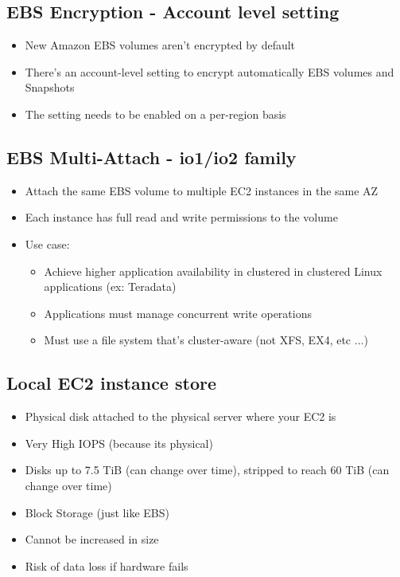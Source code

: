 \subsection{EBS Encryption - Account level setting}
\begin{itemize}
    \item New Amazon EBS volumes aren't encrypted by default
    \item There's an account-level setting to encrypt automatically EBS volumes and Snapshots
    \item The setting needs to be enabled on a per-region basis
\end{itemize}

\subsection{EBS Multi-Attach - io1/io2 family}
\begin{itemize}
    \item Attach the same EBS volume to multiple EC2 instances in the same AZ
    \item Each instance has full read and write permissions to the volume
    \item Use case:
    \begin{itemize}
        \item Achieve higher application availability in clustered in clustered Linux applications (ex: Teradata)
        \item Applications must manage concurrent write operations
        \item Must use a file system that's cluster-aware (not XFS, EX4, etc ...)
    \end{itemize}
\end{itemize}

\subsection{Local EC2 instance store}
\begin{itemize}
    \item Physical disk attached to the physical server where your EC2 is
    \item Very High IOPS (because its physical)
    \item Disks up to 7.5 TiB (can change over time), stripped to reach 60 TiB (can change over time)
    \item Block Storage (just like EBS)
    \item Cannot be increased in size
    \item Risk of data loss if hardware fails
\end{itemize}

